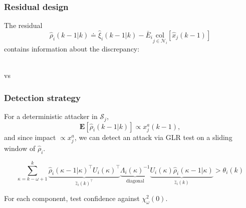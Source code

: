 \documentclass[presentation]{beamer}
\newcommand{\NN}{{\mathcal{N}}}
\newcommand{\mean}[1]{\mathbf{E}\left[#1\right]}
\newcommand{\col}[1]{\underset{{#1}}{\mathrm{col}}}
\begin{document}
\begin{frame}
	\frametitle{Residual design}
	The residual
	$$
	\hat \rho_i(k-1|k) \doteq  \hat \xi_i(k-1|k) - \bar{E}_i \col{j\in\NN_i}[\hat x_j(k-1)]
	$$
	contains information about the discrepancy: \\[3ex]
	\centering

	 \\[2ex]
	vs \\[2ex]
\end{frame}

\begin{frame}
	\frametitle{Detection strategy}

	For a deterministic attacker in $\mathcal S_j$, $$\mean{\hat \rho_i(k-1|k)} \propto x_j^a(k-1), $$ and since impact $\propto x_j^a$, we can detect an attack via GLR test on a sliding window of $\hat \rho_i$.

	$$
	\sum_{\kappa = k-\omega+1}^{k} 
	\underbrace{\hat \rho_i(\kappa-1|\kappa)^\top U_i(\kappa)^\top}_{\hat z_i(k)^\top} 
	\underbrace{\Lambda_i(\kappa)^{-1}}_{\text{diagonal}} 
	\underbrace{U_i(\kappa)\hat \rho_i(\kappa-1|\kappa)}_{\hat z_i(k)} > \theta_i(k)
	$$

	For each component, test confidence against $\chi^2_\omega(0)$.
\end{frame}
\end{document}
